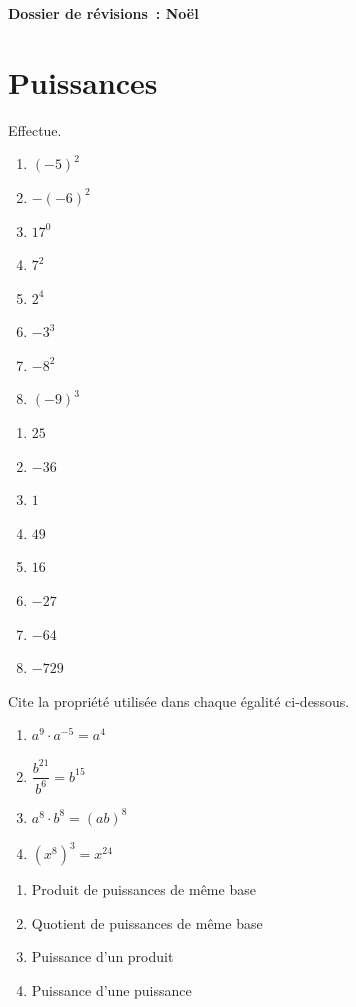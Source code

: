 


\begin{center}
  \huge\bfseries Dossier de révisions~: Noël
\end{center}

\section{Puissances}
\begin{exercise}
  Effectue.
  \begin{enumerate}[cols=4]
    \item $( - 5)^{2}$
    \item $- ( - 6)^{2}$
    \item $17^{0}$
    \item $7^{2}$
    \item $2^{4}$
    \item $- 3^{3}$
    \item $- 8^{2}$
    \item $( - 9)^{3}$
  \end{enumerate}
\end{exercise}
\begin{solution}
  \begin{enumerate}[cols=4]
    \item $25$
    \item $-36$
    \item $1$
    \item $49$
    \item $16$
    \item $-27$
    \item $-64$
    \item $-729$
  \end{enumerate}
\end{solution}

\begin{exercise}
  Cite la propriété utilisée dans chaque égalité ci-dessous.
  \begin{enumerate}[cols=2]
    \item $a^{9} \cdot a^{- 5} = a^{4}$
    \item $\dfrac{b^{21}}{b^{6}} = b^{15}$
    \item $a^{8} \cdot b^{8} = \left( ab \right)^{8}$
    \item $\left( x^{8} \right)^{3} = x^{24}$
  \end{enumerate}
\end{exercise}
\begin{solution}
  \begin{enumerate}[cols=2]
    \item Produit de puissances de même base
    \item Quotient de puissances de même base
    \item Puissance d'un produit
    \item Puissance d'une puissance
  \end{enumerate}
\end{solution}

